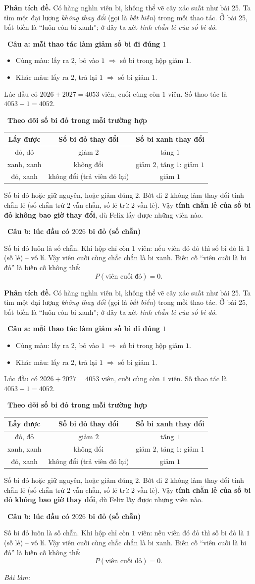\documentclass[11pt]{article}
\newif\ifsol \soltrue
\newcommand{\StuProb}[2]{\begin{probboxS}{#1}{#2}\StuProbBody\end{probboxS}}
\newcommand{\probsol}[1]{%
  \begin{lrbox}{\solmeasure}\begin{minipage}{\dimexpr\linewidth-24pt\relax}#1\end{minipage}\end{lrbox}%
  \ifsol
    \begin{solbox}#1\end{solbox}%
  \else
    \setlength{\solht}{\dimexpr\ht\solmeasure+\dp\solmeasure+0.85cm\relax}%
    \ifdim\solht<1.35cm\setlength{\solht}{1.35cm}\fi
    \ifdim\solht>\StudentMaxWork\setlength{\solht}{\StudentMaxWork}\fi
    \par\noindent\begin{minipage}{\linewidth}%
    \expandafter\StuProb\StuProbArgs
    \begin{tcolorbox}[colback=white,colframe=Line,boxrule=0.8pt,arc=5pt,
      left=8pt,right=8pt,top=4pt,bottom=4pt,height=\solht]{\footnotesize\color{Slate}\itshape\WorkWord}\end{tcolorbox}%
    \end{minipage}\par\medskip
  \fi}
\newlength{\StudentMaxWork}\setlength{\StudentMaxWork}{4.5cm}
\newcommand{\step}[2]{\par\smallskip\noindent{\bfseries\color{tmBlue!85!black}\StepWord~#1.}\ {\bfseries #2}\par\nopagebreak}
\def\WorkWord{Bài làm:}
\def\StepWord{Bước}
\begin{document}
\probsol{
\textbf{Phân tích đề.} Có hàng nghìn viên bi, không thể vẽ cây xác suất như bài 25. Ta tìm một đại lượng \emph{không thay đổi} (gọi là
\emph{bất biến}) trong mỗi thao tác. Ở bài 25, bất biến là ``luôn còn bi xanh''; ở đây ta xét \emph{tính chẵn lẻ của số bi đỏ}.

\step{1}{Câu a: mỗi thao tác làm giảm số bi đi đúng $1$}
\begin{itemize}[leftmargin=1.2em,itemsep=1pt,topsep=2pt]
\item Cùng màu: lấy ra $2$, bỏ vào $1$ $\Rightarrow$ số bi trong hộp giảm $1$.
\item Khác màu: lấy ra $2$, trả lại $1$ $\Rightarrow$ số bi giảm $1$.
\end{itemize}
Lúc đầu có $2026+2027=4053$ viên, cuối cùng còn $1$ viên. Số thao tác là $4053-1=4052$.

\step{2}{Theo dõi số bi đỏ trong mỗi trường hợp}
\begin{center}\begin{tabular}{|c|c|c|}\hline
Lấy được & Số bi đỏ thay đổi & Số bi xanh thay đổi\\\hline
đỏ, đỏ & giảm $2$ & tăng $1$\\\hline
xanh, xanh & không đổi & giảm $2$, tăng $1$: giảm $1$\\\hline
đỏ, xanh & không đổi (trả viên đỏ lại) & giảm $1$\\\hline
\end{tabular}\end{center}
\begin{proofbox}Số bi đỏ hoặc giữ nguyên, hoặc giảm đúng $2$. Bớt đi $2$ không làm thay đổi tính chẵn lẻ (số chẵn trừ $2$ vẫn chẵn,
số lẻ trừ $2$ vẫn lẻ). Vậy \textbf{tính chẵn lẻ của số bi đỏ không bao giờ thay đổi}, dù Felix lấy được những viên nào.\end{proofbox}

\step{3}{Câu b: lúc đầu có $2026$ bi đỏ (số chẵn)}
Số bi đỏ luôn là số chẵn. Khi hộp chỉ còn $1$ viên: nếu viên đó đỏ thì số bi đỏ là $1$ (số lẻ) -- vô lí. Vậy viên cuối cùng chắc chắn
là bi xanh. Biến cố ``viên cuối là bi đỏ'' là biến cố không thể:
\[P(\text{viên cuối đỏ})=0.\]

}
\end{document}

